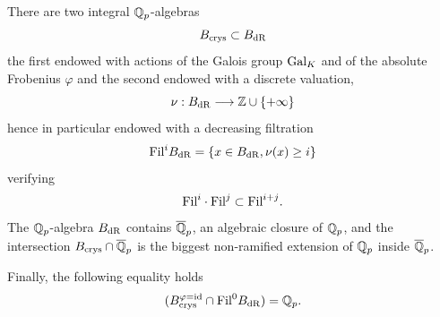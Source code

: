 \documentclass[11pt]{amsart}
\begin{document}
\begin{theorem}\label{javier} \cite{Fonfon}
There are two integral $\mathbb{Q}_p$-algebras \[B_{\textnormal{crys}} \subset B_{\mathrm{dR}}\] the first endowed with  actions of the Galois group $\textnormal{Gal}_K$ and of the absolute Frobenius $\varphi$ and the second endowed with a discrete valuation,  
\[\nu: B_{\mathrm{dR}} \longrightarrow \mathbb{Z} \cup \{+\infty\}\]
hence in particular endowed with a decreasing filtration \[\textnormal{Fil}^i B_{\mathrm{dR}}=\{x \in B_{\mathrm{dR}}, \nu(x)\geq i\}\] verifying 
\[\textnormal{Fil}^i \cdot \textnormal{Fil}^j \subset \textnormal{Fil}^{i+j}.\] 
The $\mathbb{Q}_p$-algebra $ B_{\mathrm{dR}}$ contains $\overline{\mathbb{Q}}_p$, an algebraic closure of $\mathbb{Q}_p$, and the intersection $ B_{\textnormal{crys}} \cap \overline{\mathbb{Q}}_p$ is the biggest non-ramified extension of $\mathbb{Q}_p$ inside $\overline{\mathbb{Q}}_p$.

Finally, the following equality holds \cite[Theorem 5.3.7]{Fontp}
 \begin{equation}\label{eq:fontaine}(B_{\textnormal{crys}}^{\varphi=\mathrm{id}} \cap \textnormal{Fil}^0B_{\mathrm{dR}})=\mathbb{Q}_p.\end{equation}
\end{theorem}
\end{document}
